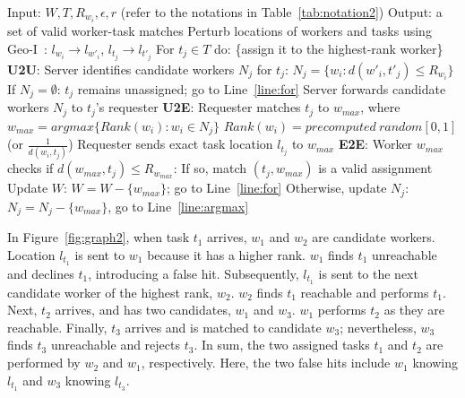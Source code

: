\documentclass{USC-Thesis}
\renewcommand{\sc}{\textsc}
\numberwithin{equation}{chapter}
\begin{document}
\begin{algorithm} [ht]
\caption{\sc Oblivious Algorithm (Baseline)}
\small
\begin{algorithmic}[1]
\STATE Input: $W, T, R_{w_i}, \epsilon,r$ (refer to the notations in Table~\ref{tab:notation2})
\STATE Output: a set of valid worker-task matches
\STATE Perturb locations of workers and tasks using Geo-I~\cite{andres2013geo}: \label{line:perturb}
\STATE \hspace{6pt} $l_{w_i}\rightarrow l_{w'_i}$, $l_{t_j}\rightarrow l_{t'_j}$ \label{line:perturb2}
\STATE For $t_j\in T$ do: \{assign it to the highest-rank worker\} \label{line:for}
\STATE \hspace{6pt} \textbf{U2U}: Server identifies candidate workers $N_j$ for $t_j$:
\STATE \hspace{18pt} $\mathit{N_j=\{w_i : d(w'_i, t'_j)\le R_{w_i}\}}$ \label{line:reachable_workers}
\STATE \hspace{12pt} If $N_j=\emptyset$: $t_j$ remains unassigned; go to Line~\ref{line:for} \label{line:next}
\STATE \hspace{12pt} Server forwards candidate workers $N_j$ to $t_j$'s requester \label{line:forward}
\STATE \hspace{6pt} \textbf{U2E}: Requester matches $t_j$ to $\mathit{w_{max}}$, where \label{line:argmax} 
\STATE \hspace{12pt} $\mathit{w_{max}=argmax\{Rank(w_i):w_i\in N_j\}}$
\STATE \hspace{18pt} $\mathit{Rank(w_i)=precomputed\ random[0,1]}$ (or $\frac{1}{d(w_i,t_j)}$) \label{line:rank}
\STATE \hspace{12pt} Requester sends exact task location $l_{t_j}$ to $\mathit{w_{max}}$ \label{line:u2e}
\STATE \hspace{6pt} \textbf{E2E}: Worker $\mathit{w_{max}}$ checks if $\mathit{d(w_{max}, t_j) \le R_{w_{max}}}$: \label{line:check}
\STATE \hspace{12pt} If so, match $\mathit{(t_j,w_{max})}$ is a valid assignment
\STATE \hspace{18pt} Update $W$: $\mathit{W=W-\{w_{max}\}}$; go to Line~\ref{line:for}
\STATE \hspace{12pt} Otherwise, update $N_j$: $\mathit{N_j=N_j-\{w_{max}\}}$, go to Line~\ref{line:argmax} \label{line:goto_next}
\end{algorithmic}
\label{alg:baseline}
\end{algorithm}

In Figure~\ref{fig:graph2}, when task $t_1$ arrives, $w_1$ and $w_2$ are candidate workers. Location $l_{t_1}$ is sent to $w_1$ because it has a higher rank. $w_1$ finds $t_1$ unreachable and declines $t_1$, introducing a false hit. Subsequently, $l_{t_1}$ is sent to the next candidate worker of the highest rank, $w_2$.  $w_2$ finds $t_1$ reachable and performs $t_1$.
Next, $t_2$ arrives, and has two candidates, $w_1$ and $w_3$. $w_1$ performs $t_2$ as they are reachable. Finally, $t_3$ arrives and is matched to candidate $w_3$; nevertheless, $w_3$ finds $t_3$ unreachable and rejects $t_3$. In sum, the two assigned tasks $t_1$ and $t_2$ are performed by $w_2$ and $w_1$, respectively. Here, the two false hits include $w_1$ knowing $l_{t_1}$ and $w_3$ knowing $l_{t_3}$.
\end{document}
